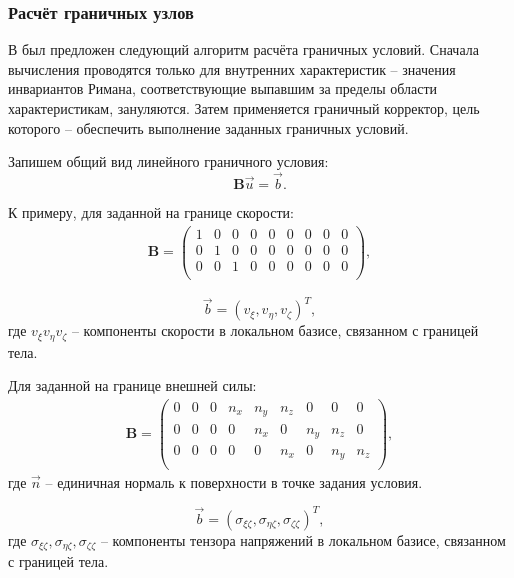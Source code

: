 \subsubsection{Расчёт граничных узлов}
В \cite{chelnokov} был предложен следующий алгоритм расчёта граничных условий. Сначала вычисления проводятся только для внутренних характеристик -- значения инвариантов Римана, соответствующие выпавшим за пределы области характеристикам, зануляются. Затем применяется граничный корректор, цель которого -- обеспечить выполнение заданных граничных условий.

Запишем общий вид линейного граничного условия:
\begin{equation}
	\label{general_border_condition}
	\mathbf{B} \vec{u} = \vec{b}.
\end{equation}

К примеру, для заданной на границе скорости:
\begin{align}
\mathbf{B} =
\left( \begin{array}{cccccccccccc}
1 & 0 & 0 & 0 & 0 & 0 & 0 & 0 & 0 \\ 
0 & 1 & 0 & 0 & 0 & 0 & 0 & 0 & 0 \\ 
0 & 0 & 1 & 0 & 0 & 0 & 0 & 0 & 0 \\ 
\end{array} \right),
\end{align}

\begin{equation}
	\vec{b} = \left( v_{\xi}, v_{\eta}, v_{\zeta} \right)^T,
\end{equation}
где $ v_{\xi} v_{\eta} v_{\zeta}$ -- компоненты скорости в локальном базисе, связанном с границей тела.

Для заданной на границе внешней силы:
\begin{align}
\mathbf{B} =
\left( \begin{array}{cccccccccccc}
0 & 0 & 0 & n_x & n_y & n_z & 0 & 0 & 0 \\ 
0 & 0 & 0 & 0 & n_x & 0 & n_y & n_z & 0 \\ 
0 & 0 & 0 & 0 & 0 & n_x & 0 & n_y & n_z \\ 
\end{array} \right),
\end{align}
где $\vec{n}$ -- единичная нормаль к поверхности в точке задания условия.

\begin{equation}
	\vec{b} = \left( \sigma_{\xi \zeta}, \sigma_{\eta \zeta}, \sigma_{\zeta \zeta} \right)^T,
\end{equation}
где $\sigma_{\xi \zeta}, \sigma_{\eta \zeta}, \sigma_{\zeta \zeta}$ -- компоненты тензора напряжений в локальном базисе, связанном с границей тела.

